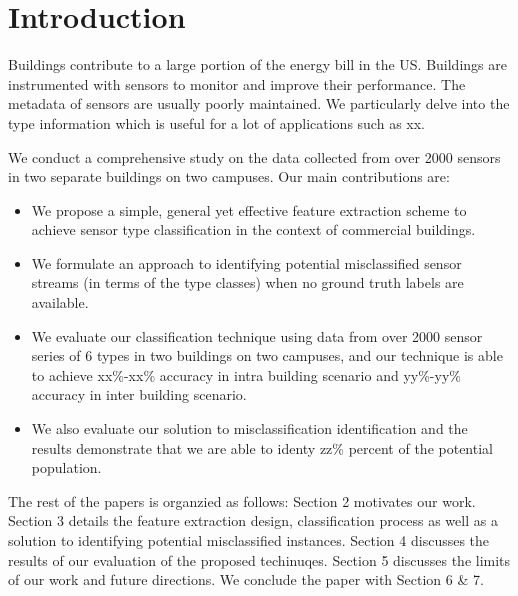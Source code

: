 \section{Introduction}
Buildings contribute to a large portion of the energy bill in the US.
Buildings are instrumented with sensors to monitor and improve their performance.
The metadata of sensors are usually poorly maintained. We particularly delve into the type information which is useful for a lot of applications such as xx.

We conduct a comprehensive study on the data collected from over 2000 sensors in two separate buildings on two campuses. Our main contributions are:

\begin{itemize}
\item We propose a simple, general yet effective feature extraction scheme to achieve sensor type classification in the context of commercial buildings.
\item We formulate an approach to identifying potential misclassified sensor streams (in terms of the type classes) when no ground truth labels are available.
\item We evaluate our classification technique using data from over 2000 sensor series of 6 types in two buildings on two campuses, and our technique is able to achieve xx\%-xx\% accuracy in intra building scenario and yy\%-yy\% accuracy in inter building scenario.
\item We also evaluate our solution to misclassification identification and the results demonstrate that we are able to identy zz\% percent of the potential population.
\end{itemize}

The rest of the papers is organzied as follows: Section 2 motivates our work. Section 3 details the feature extraction design, classification process as well as a solution to identifying potential misclassified instances. Section 4 discusses the results of our evaluation of the proposed techinuqes. Section 5 discusses the limits of our work and future directions. We conclude the paper with Section 6 \& 7.